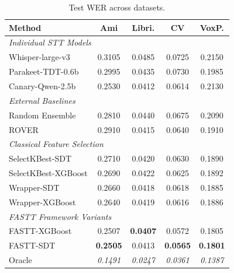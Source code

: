 \begin{table}[t]
    \centering
    \caption{Test WER across datasets.}
    \label{tab:wer_results} \small
    \begin{tabular}{lcccc}
        \toprule \textbf{Method}                                         & Ami             & Libri.          & CV              & VoxP.           \\
        \midrule \multicolumn{5}{l}{\textit{Individual STT Models}}       \\
        Whisper-large-v3                                                 & 0.3105          & 0.0485          & 0.0725          & 0.2150          \\
        Parakeet-TDT-0.6b                                                & 0.2995          & 0.0435          & 0.0730          & 0.1985          \\
        Canary-Qwen-2.5b                                                 & 0.2530          & 0.0412          & 0.0614          & 0.2130          \\
        \midrule \multicolumn{5}{l}{\textit{External Baselines}}          \\
        Random Ensemble                                                  & 0.2810          & 0.0440          & 0.0675          & 0.2090          \\
        ROVER                                                            & 0.2910          & 0.0415          & 0.0640          & 0.1910          \\
        \midrule \multicolumn{5}{l}{\textit{Classical Feature Selection}} \\
        SelectKBest-SDT                                                  & 0.2710          & 0.0420          & 0.0630          & 0.1890          \\
        SelectKBest-XGBoost                                              & 0.2690          & 0.0422          & 0.0625          & 0.1892          \\
        Wrapper-SDT                                                      & 0.2660          & 0.0418          & 0.0618          & 0.1885          \\
        Wrapper-XGBoost                                                  & 0.2640          & 0.0419          & 0.0616          & 0.1886          \\
        \midrule \multicolumn{5}{l}{\textit{FASTT Framework Variants}}    \\
        FASTT-XGBoost                                                    & 0.2507          & \textbf{0.0407} & 0.0572          & 0.1805          \\
        FASTT-SDT                                                        & \textbf{0.2505} & 0.0413          & \textbf{0.0565} & \textbf{0.1801} \\
        \midrule Oracle                                                  & \textit{0.1491} & \textit{0.0247} & \textit{0.0361} & \textit{0.1387} \\
        \bottomrule
    \end{tabular}
\end{table}
